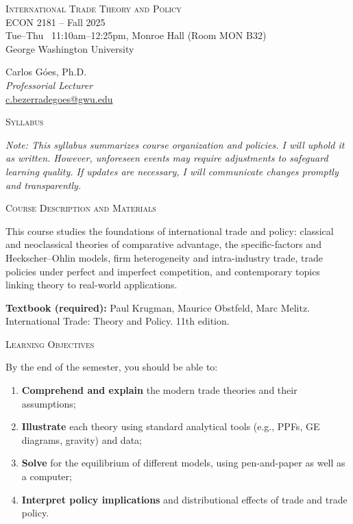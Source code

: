 \documentclass[11pt]{article}
\begin{document}
\begin{center}
\Large{\textsc{International Trade Theory and Policy}}\\[4pt]
\Large{ECON 2181 \;--\; Fall 2025}\\[6pt]
\LARGE{Tue--Thu \, 11:10am--12:25pm, Monroe Hall (Room MON B32)}\\[4pt]
\Large{George Washington University}
\end{center}

\medskip

\begin{center}
\large Carlos Góes, Ph.D. \\
\textit{Professorial Lecturer}\\
\href{mailto:c.bezerradegoes@gwu.edu}{c.bezerradegoes@gwu.edu} \\
\end{center}

\bigskip

\begin{center}
\Large{\textsc{Syllabus}}
\end{center}

\bigskip

\noindent \textit{Note: This syllabus summarizes course organization and policies. I will uphold it as written. However, unforeseen events may require adjustments to safeguard learning quality. If updates are necessary, I will communicate changes promptly and transparently.}

\bigskip

\noindent\textsc{Course Description and Materials}

\smallskip
This course studies the foundations of international trade and policy: classical and neoclassical theories of comparative advantage, the specific-factors and Heckscher–Ohlin models, firm heterogeneity and intra-industry trade, trade policies under perfect and imperfect competition, and contemporary topics linking theory to real-world applications. 

\medskip
\textbf{Textbook (required):} Paul Krugman,  Maurice Obstfeld, Marc Melitz. International Trade: Theory and Policy. 11th edition.

\bigskip

\noindent\textsc{Learning Objectives}

\smallskip
By the end of the semester, you should be able to:
\begin{enumerate}
    \item \textbf{Comprehend and explain} the modern trade theories and their assumptions;
    \item \textbf{Illustrate} each theory using standard analytical tools (e.g., PPFs, GE diagrams, gravity) and data;
    \item \textbf{Solve} for the equilibrium of different models, using pen-and-paper as well as a computer;
    \item \textbf{Interpret policy implications} and distributional effects of trade and trade policy.
\end{enumerate}
\end{document}
